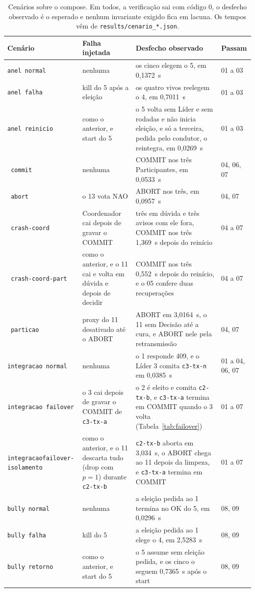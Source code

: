 \documentclass[conference]{IEEEtran}
\newcommand{\cod}[1]{\texttt{\upshape #1}}
\begin{document}
\begin{table}[t]
\caption{Cenários sobre o compose. Em todos, a verificação sai com código 0, o desfecho observado
é o esperado e nenhum invariante exigido fica em lacuna. Os tempos vêm de
\cod{results/cenario\_*.json}.}
\label{tab:cenarios}
\centering
\footnotesize
\setlength{\tabcolsep}{4pt}
\begin{tabular}{@{}>{\raggedright\arraybackslash}p{3.45cm}>{\raggedright\arraybackslash}p{3.95cm}
  >{\raggedright\arraybackslash}p{7.75cm}l@{}}
\toprule
Cenário & Falha injetada & Desfecho observado & Passam \\
\midrule
\cod{anel normal} & nenhuma & os cinco elegem o 5, em 0,1372~s & 01 a 03 \\
\cod{anel falha} & kill do 5 após a eleição & os quatro vivos reelegem o 4, em 0,7011~s & 01 a 03 \\
\cod{anel reinicio} & como o anterior, e start do 5 & o 5 volta sem Líder e sem rodadas e não
inicia eleição, e só a terceira, pedida pelo condutor, o reintegra, em 0,0269~s & 01 a 03 \\
\cod{2pc commit} & nenhuma & COMMIT nos três Participantes, em 0,0533~s & 04, 06, 07 \\
\cod{2pc abort} & o 13 vota NAO & ABORT nos três, em 0,0957~s & 04, 07 \\
\cod{2pc crash-coord} & Coordenador cai depois de gravar o COMMIT & três em dúvida e três avisos
com ele fora, COMMIT nos três 1,369~s depois do reinício & 04 a 07 \\
\cod{2pc crash-coord-part} & como o anterior, e o 11 cai e volta em dúvida e depois de decidir &
COMMIT nos três 0,552~s depois do reinício, e o 05 confere duas recuperações & 04 a 07 \\
\cod{2pc particao} & proxy do 11 desativado até o ABORT & ABORT em 3,0164~s, o 11 sem Decisão até a
cura, e ABORT nele pela retransmissão & 04, 07 \\
\cod{integracao normal} & nenhuma & o 1 responde 409, e o Líder 3 comita \cod{c3-tx-n} em 0,0385~s &
01 a 04, 06, 07 \\
\cod{integracao failover} & o 3 cai depois de gravar o COMMIT de \cod{c3-tx-a} & o 2 é eleito e
comita \cod{c2-tx-b}, e \cod{c3-tx-a} termina em COMMIT quando o 3 volta
(Tabela~\ref{tab:failover}) & 01 a 07 \\
\cod{integracao}\newline\cod{failover-isolamento} & como o anterior, e o 11 descarta tudo (drop com $p=1$)
durante \cod{c2-tx-b} & \cod{c2-tx-b} aborta em 3,034~s, o ABORT chega ao 11 depois da limpeza, e
\cod{c3-tx-a} termina em COMMIT & 01 a 07 \\
\cod{bully normal} & nenhuma & a eleição pedida ao 1 termina no OK do 5, em 0,0296~s & 08, 09 \\
\cod{bully falha} & kill do 5 & a eleição pedida ao 1 elege o 4, em 2,5283~s & 08, 09 \\
\cod{bully retorno} & como o anterior, e start do 5 & o 5 assume sem eleição pedida, e os cinco
o seguem 0,7365~s após o start & 08, 09 \\
\bottomrule
\end{tabular}
\end{table}
\end{document}
